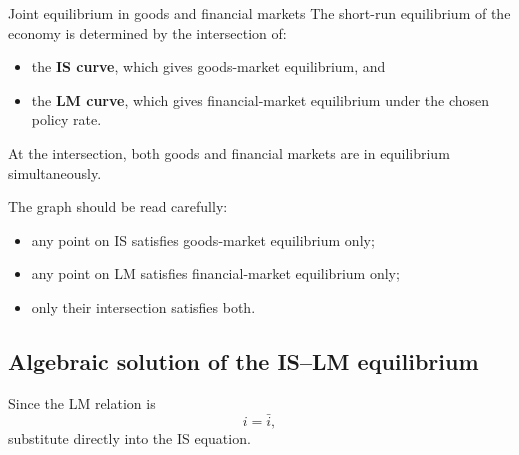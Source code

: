 \begin{theorem}{Joint equilibrium in goods and financial markets}{}
The short-run equilibrium of the economy is determined by the intersection of:
\begin{itemize}[leftmargin=1.5em]
\item the \textbf{IS curve}, which gives goods-market equilibrium, and
\item the \textbf{LM curve}, which gives financial-market equilibrium under the chosen policy rate.
\end{itemize}
At the intersection, both goods and financial markets are in equilibrium simultaneously.
\end{theorem}

\begin{center}
\end{center}

\noindent
The graph should be read carefully:
\begin{itemize}[leftmargin=1.5em]
\item any point on IS satisfies goods-market equilibrium only;
\item any point on LM satisfies financial-market equilibrium only;
\item only their intersection satisfies both.
\end{itemize}

\subsection{Algebraic solution of the IS--LM equilibrium}

Since the LM relation is
\[
i=\bar{i},
\]
substitute directly into the IS equation.

